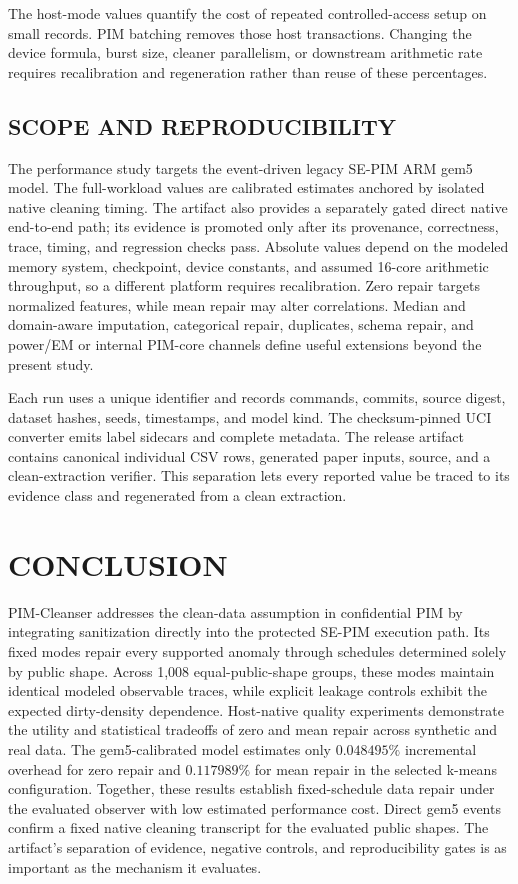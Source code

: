 \documentclass[conference]{IEEEtran}
\begin{document}
The host-mode values quantify the cost of repeated controlled-access setup on
small records. PIM batching removes those host transactions.
Changing the device formula, burst size, cleaner parallelism, or downstream
arithmetic rate requires recalibration and regeneration rather than reuse of
these percentages.

\subsection{SCOPE AND REPRODUCIBILITY}
The performance study targets the event-driven legacy SE-PIM ARM gem5 model.
The full-workload values are calibrated estimates anchored by isolated native
cleaning timing. The artifact also provides a separately gated direct native
end-to-end path; its evidence is promoted only after its provenance,
correctness, trace, timing, and regression checks pass. Absolute values depend
on the modeled memory system, checkpoint, device constants, and assumed
16-core arithmetic throughput, so a different platform requires recalibration.
Zero repair targets normalized features, while mean repair may alter
correlations. Median and domain-aware imputation, categorical repair,
duplicates, schema repair, and power/EM or internal PIM-core channels define
useful extensions beyond the present study.

Each run uses a unique identifier and records commands, commits, source digest,
dataset hashes, seeds, timestamps, and model kind. The checksum-pinned UCI
converter emits label sidecars and complete metadata. The release artifact
contains canonical individual CSV rows, generated paper inputs, source, and a
clean-extraction verifier. This separation lets every reported value be traced
to its evidence class and regenerated from a clean extraction.

\section{CONCLUSION}
PIM-Cleanser addresses the clean-data assumption in confidential PIM by integrating
sanitization directly into the protected SE-PIM execution path. Its fixed modes
repair every supported anomaly through schedules determined solely by public
shape. Across 1,008 equal-public-shape groups, these modes maintain identical
modeled observable traces, while explicit leakage controls exhibit the expected
dirty-density dependence. Host-native quality experiments demonstrate the
utility and statistical tradeoffs of zero and mean repair across synthetic and
real data. The gem5-calibrated model estimates only $0.048495\%$ incremental
overhead for zero repair and $0.117989\%$ for mean repair in the selected
k-means configuration. Together, these results establish fixed-schedule data
repair under the evaluated observer with low estimated performance cost.
Direct gem5 events \cite{LowePower2020} confirm a fixed native cleaning
transcript for the evaluated public shapes. The artifact's separation of
evidence, negative controls, and reproducibility gates is as important as
the mechanism it evaluates.
\end{document}
